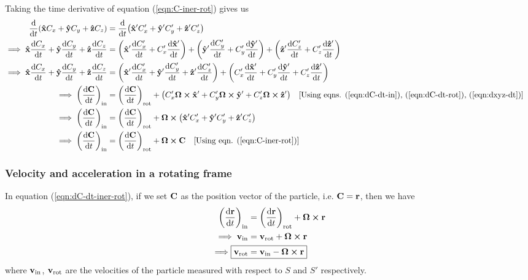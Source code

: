 			Taking the time derivative of equation (\ref{eqn:C-iner-rot}) gives us
			\begin{align}
				\dv{t}\qty(\vu{x}C_x+\vu{y}C_y+\vu{z}C_z)&=\dv{t}\qty(\vu{x}'C_x'+\vu{y}'C_y'+\vu{z}'C_z') \nonumber\\
				\implies\vu{x}\dv{C_x}{t}+\vu{y}\dv{C_y}{t}+\vu{z}\dv{C_z}{t}&=\qty(\vu{x}'\dv{C_x'}{t}+C_x'\dv{\vu{x}'}{t})+\qty(\vu{y}'\dv{C_y'}{t}+C_y'\dv{\vu{y}'}{t})+\qty(\vu{z}'\dv{C_z'}{t}+C_z'\dv{\vu{z}'}{t}) \nonumber\\
				\implies\vu{x}\dv{C_x}{t}+\vu{y}\dv{C_y}{t}+\vu{z}\dv{C_z}{t}&=\qty(\vu{x}'\dv{C_x'}{t}+\vu{y}'\dv{C_y'}{t}+\vu{z}'\dv{C_z'}{t})+\qty(C_x'\dv{\vu{x}'}{t}+C_y'\dv{\vu{y}'}{t}+C_z'\dv{\vu{z}'}{t}) \nonumber\\
				\implies\qty(\dv{\vb{C}}{t})_\text{in}&=\qty(\dv{\vb{C}}{t})_\text{rot}+\qty(C_x'\vb{\Omega}\cross\vu{x}'+C_y'\vb{\Omega}\cross\vu{y}'+C_z'\vb{\Omega}\cross\vu{z}') \qq{[Using eqns. (\ref{eqn:dC-dt-in}), (\ref{eqn:dC-dt-rot}), (\ref{eqn:dxyz-dt})]} \nonumber\\
				\implies\qty(\dv{\vb{C}}{t})_\text{in}&=\qty(\dv{\vb{C}}{t})_\text{rot}+\vb{\Omega}\cross\qty(\vu{x}'C_x'+\vu{y}'C_y'+\vu{z}'C_z') \nonumber\\
				\implies\qty(\dv{\vb{C}}{t})_\text{in}&=\qty(\dv{\vb{C}}{t})_\text{rot}+\vb{\Omega}\cross\vb{C} \qq{[Using eqn. (\ref{eqn:C-iner-rot})]} \label{eqn:dC-dt-iner-rot}
			\end{align}
			
		\subsubsection{Velocity and acceleration in a rotating frame}
			In equation (\ref{eqn:dC-dt-iner-rot}), if we set $\vb{C}$ as the position vector of the particle, i.e. $\vb{C}=\vb{r}$, then we have
			\begin{align}
				\qty(\dv{\vb{r}}{t})_\text{in}&=\qty(\dv{\vb{r}}{t})_\text{rot}+\vb{\Omega}\cross\vb{r} \nonumber\\
				\implies\vb{v}_\text{in}&=\vb{v}_\text{rot}+\vb{\Omega}\cross\vb{r} \label{eqn:vin-vrot}\\
				\implies\Aboxed{\vb{v}_\text{rot}&=\vb{v}_\text{in}-\vb{\Omega}\cross\vb{r}} \label{eqn:vrot-vin}
			\end{align}
			where $\vb{v}_\text{in}$, $\vb{v}_\text{rot}$ are the velocities of the particle measured with respect to $S$ and $S'$ respectively.
			
